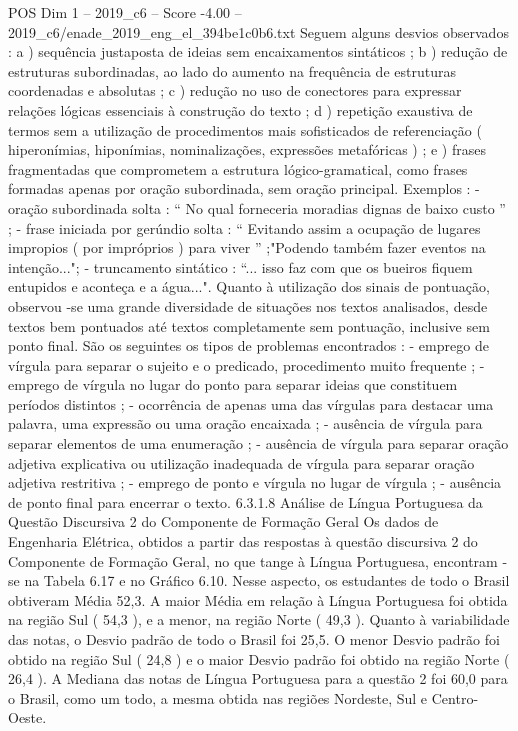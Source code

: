 \begin{textsample}{POS Dim 1 – 2019\_c6 – Score -4.00 – 2019\_c6/enade\_2019\_eng\_el\_394be1c0b6.txt}
Seguem alguns desvios observados : a ) sequência justaposta de ideias sem encaixamentos sintáticos ; b ) redução de estruturas subordinadas, ao lado do aumento na frequência de estruturas coordenadas e absolutas ; c ) redução no uso de conectores para expressar relações lógicas essenciais à construção do texto ; d ) repetição exaustiva de termos sem a utilização de procedimentos mais sofisticados de referenciação ( hiperonímias, hiponímias, nominalizações, expressões metafóricas ) ; e ) frases fragmentadas que comprometem a estrutura lógico-gramatical, como frases formadas apenas por oração subordinada, sem oração principal.
Exemplos : - oração subordinada solta : “ No qual forneceria moradias dignas de baixo custo ” ; - frase iniciada por gerúndio solta : “ Evitando assim a ocupação de lugares impropios ( por impróprios ) para viver ” ;"Podendo também fazer eventos na intenção..."; - truncamento sintático : “... isso faz com que os bueiros fiquem entupidos e aconteça e a água...".
Quanto à utilização dos sinais de pontuação, observou -se uma grande diversidade de situações nos textos analisados, desde textos bem pontuados até textos completamente sem pontuação, inclusive sem ponto final.
São os seguintes os tipos de problemas encontrados : - emprego de vírgula para separar o sujeito e o predicado, procedimento muito frequente ; - emprego de vírgula no lugar do ponto para separar ideias que constituem períodos distintos ; - ocorrência de apenas uma das vírgulas para destacar uma palavra, uma expressão ou uma oração encaixada ; - ausência de vírgula para separar elementos de uma enumeração ; - ausência de vírgula para separar oração adjetiva explicativa ou utilização inadequada de vírgula para separar oração adjetiva restritiva ; - emprego de ponto e vírgula no lugar de vírgula ; - ausência de ponto final para encerrar o texto. 6.3.1.8 Análise de Língua Portuguesa da Questão Discursiva 2 do Componente de Formação Geral Os dados de Engenharia Elétrica, obtidos a partir das respostas à questão discursiva 2 do Componente de Formação Geral, no que tange à Língua Portuguesa, encontram -se na Tabela 6.17 e no Gráfico 6.10.
Nesse aspecto, os estudantes de todo o Brasil obtiveram Média 52,3.
A maior Média em relação à Língua Portuguesa foi obtida na região Sul ( 54,3 ), e a menor, na região Norte ( 49,3 ).
Quanto à variabilidade das notas, o Desvio padrão de todo o Brasil foi 25,5.
O menor Desvio padrão foi obtido na região Sul ( 24,8 ) e o maior Desvio padrão foi obtido na região Norte ( 26,4 ).
A Mediana das notas de Língua Portuguesa para a questão 2 foi 60,0 para o Brasil, como um todo, a mesma obtida nas regiões Nordeste, Sul e Centro-Oeste.

\end{textsample}
